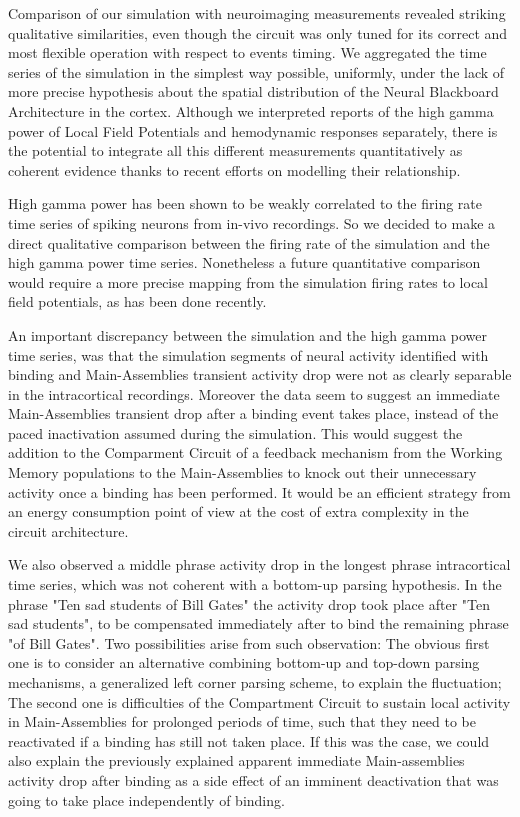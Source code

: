 \documentclass[10pt]{article}
\begin{document}
Comparison of our simulation with neuroimaging measurements revealed striking qualitative similarities, even though the circuit was only tuned for its correct and most flexible operation with respect to events timing.
We aggregated the time series of the simulation in the simplest way possible, uniformly, under the lack of more precise hypothesis about the spatial distribution of the Neural Blackboard Architecture in the cortex.
Although we interpreted reports of the high gamma power of Local Field Potentials and hemodynamic responses separately, there is the potential to integrate all this different measurements quantitatively as coherent evidence thanks to recent efforts on modelling their relationship\cite{hermes2017neuronal}.

High gamma power has been shown to be weakly correlated to the firing rate time series of spiking neurons from in-vivo recordings\cite{Ray_2011}.
So we decided to make a direct qualitative comparison between the firing rate of the simulation and the high gamma power time series.
Nonetheless a future quantitative comparison would require a more precise mapping from the simulation firing rates to local field potentials, as has been done recently\cite{Mazzoni_2015,Hagen_2015}.

An important discrepancy between the simulation and the high gamma power time series, was that the simulation segments of neural activity identified with binding and Main-Assemblies transient activity drop were not as clearly separable in the intracortical recordings.
Moreover the data seem to suggest an immediate Main-Assemblies transient drop after a binding event takes place, instead of the paced inactivation assumed during the simulation.
This would suggest the addition to the Comparment Circuit of a feedback mechanism from the Working Memory populations to the Main-Assemblies to knock out their unnecessary activity once a binding has been performed.
It would be an efficient strategy from an energy consumption point of view at the cost of extra complexity in the circuit architecture.

We also observed a middle phrase activity drop in the longest phrase intracortical time series,  which was not coherent with a bottom-up parsing hypothesis. In the phrase "Ten sad students of Bill Gates" the activity drop took place after "Ten sad students", to be compensated immediately after to bind the remaining phrase "of Bill Gates".
Two possibilities arise from such observation:
The obvious first one is to consider an alternative combining bottom-up and top-down parsing mechanisms, a generalized left corner parsing scheme, to explain the fluctuation;
The second one is difficulties of the Compartment Circuit to sustain local activity in Main-Assemblies for prolonged periods of time, such that they need to be reactivated if a binding has still not taken place.
If this was the case, we could also explain the previously explained apparent immediate Main-assemblies activity drop after binding as a side effect of an imminent deactivation that was going to take place independently of binding.
\end{document}

